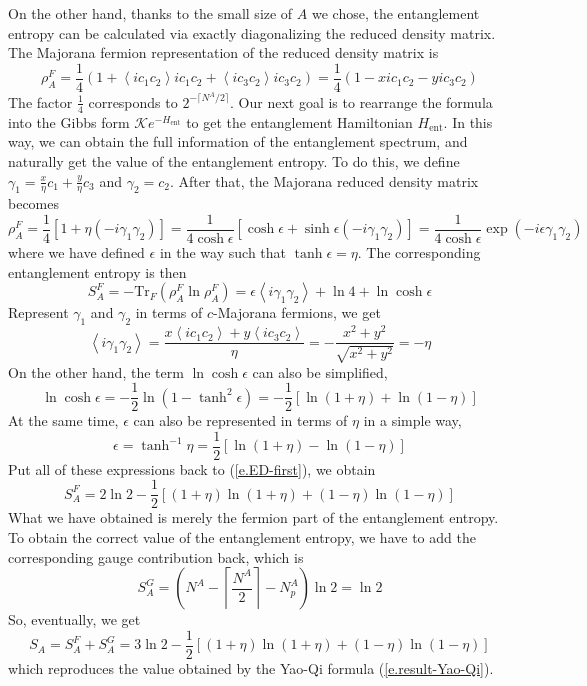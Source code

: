 \documentclass[12font]{article}
\theoremstyle{definition}
\newcommand{\anglelr}[1]{\left\langle #1 \right\rangle}
\newcommand{\lr}[1]{\left(  #1  \right)}
\newcommand{\lrm}[1]{\left[  #1  \right]}
\newcommand{\mrm}[1]{\mathrm{#1}}
\newcommand{\Tr}{\mrm{Tr}}
\begin{document}
On the other hand, thanks to the small size of $A$ we chose, the entanglement entropy can be calculated via exactly diagonalizing the reduced density matrix. The Majorana fermion representation of the reduced density matrix is
\[
\rho^F_A = \frac{1}{4}\lr{1 + \anglelr{ic_1c_2}ic_1c_2 + \anglelr{ic_3c_2}ic_3c_2} = \frac{1}{4}\lr{1 - xic_1c_2 - yic_3c_2}
\]
The factor $\frac{1}{4}$ corresponds to $2^{-\lceil N^A/2\rceil}$. Our next goal is to rearrange the formula into the Gibbs form $\mathcal{K}e^{-H_\mrm{ent}}$ to get the entanglement Hamiltonian $H_{\mrm{ent}}$. In this way, we can obtain the full information of the entanglement spectrum, and naturally get the value of the entanglement entropy. To do this, we define $\gamma_1=\frac{x}{\eta}c_1 + \frac{y}{\eta}c_3$ and $\gamma_2=c_2$. After that, the Majorana reduced density matrix becomes
\[
\rho^F_A = \frac{1}{4}\lrm{1 + \eta \lr{-i\gamma_1\gamma_2}} = \frac{1}{4\cosh\epsilon}\lrm{\cosh\epsilon+\sinh\epsilon\lr{-i\gamma_1\gamma_2}} = \frac{1}{4\cosh\epsilon}\exp\lr{-i\epsilon\gamma_1\gamma_2}
\]
where we have defined $\epsilon$ in the way such that $\tanh\epsilon=\eta$. The corresponding entanglement entropy is then
\begin{equation}\label{e.ED-first}
S^F_A = -\Tr_F\lr{\rho^F_A\ln\rho^F_A} = \epsilon\anglelr{i\gamma_1\gamma_2} + \ln 4 + \ln \cosh\epsilon
\end{equation}
Represent $\gamma_1$ and $\gamma_2$ in terms of $c$-Majorana fermions, we get
\[
\anglelr{i\gamma_1\gamma_2} = \frac{x\anglelr{ic_1c_2} + y\anglelr{ic_3c_2}}{\eta} = -\frac{x^2+y^2}{\sqrt{x^2+y^2}} = -\eta
\]
On the other hand, the term $\ln\cosh\epsilon$ can also be simplified,
\[
\ln\cosh\epsilon = -\frac{1}{2}\ln\lr{1-\tanh^2\epsilon} = -\frac{1}{2}\lrm{\ln\lr{1+\eta} + \ln\lr{1-\eta}}
\]
At the same time, $\epsilon$ can also be represented in terms of $\eta$ in a simple way,
\[
\epsilon = \tanh^{-1}\eta = \frac{1}{2}\lrm{\ln\lr{1+\eta} - \ln\lr{1-\eta}}
\]
Put all of these expressions back to (\ref{e.ED-first}), we obtain
\begin{equation}\label{e.ED-Majo}
S^F_A = 2\ln2 - \frac{1}{2}\lrm{\lr{1+\eta}\ln\lr{1+\eta} + \lr{1-\eta}\ln\lr{1-\eta}}
\end{equation}
What we have obtained is merely the fermion part of the entanglement entropy. To obtain the correct value of the entanglement entropy, we have to add the corresponding gauge contribution back, which is
\[
S^G_A = \lr{N^A-\left\lceil \frac{N^A}{2} \right\rceil - N^A_p}\ln 2 = \ln2
\]
So, eventually, we get
\begin{equation}\label{e.ED-result}
  S_A = S^F_A + S^G_A = 3\ln2 - \frac{1}{2}\lrm{\lr{1+\eta}\ln\lr{1+\eta} + \lr{1-\eta}\ln\lr{1-\eta}}
\end{equation}
which reproduces the value obtained by the Yao-Qi formula (\ref{e.result-Yao-Qi}). 
\end{document}
